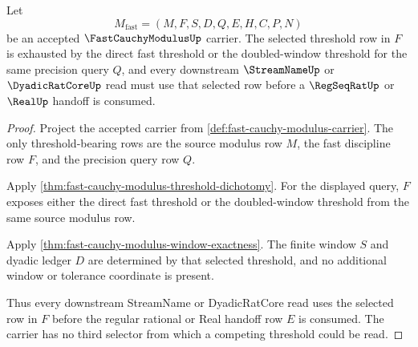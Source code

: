 \begin{theorem}
\label{thm:fast-cauchy-modulus-threshold-minimality}
Let
$$
M_{\mathrm{fast}}=(M,F,S,D,Q,E,H,C,P,N)
$$
be an accepted $\FastCauchyModulusUp$ carrier. The selected threshold row in $F$ is exhausted by the direct fast threshold or the doubled-window threshold for the same precision query $Q$, and every downstream $\StreamNameUp$ or $\DyadicRatCoreUp$ read must use that selected row before a $\RegSeqRatUp$ or $\RealUp$ handoff is consumed.
\end{theorem}
\begin{proof}
Project the accepted carrier from \autoref{def:fast-cauchy-modulus-carrier}. The only threshold-bearing rows are the source modulus row $M$, the fast discipline row $F$, and the precision query row $Q$.

Apply \autoref{thm:fast-cauchy-modulus-threshold-dichotomy}. For the displayed query, $F$ exposes either the direct fast threshold or the doubled-window threshold from the same source modulus row.

Apply \autoref{thm:fast-cauchy-modulus-window-exactness}. The finite window $S$ and dyadic ledger $D$ are determined by that selected threshold, and no additional window or tolerance coordinate is present.

Thus every downstream StreamName or DyadicRatCore read uses the selected row in $F$ before the regular rational or Real handoff row $E$ is consumed. The carrier has no third selector from which a competing threshold could be read.
\end{proof}

